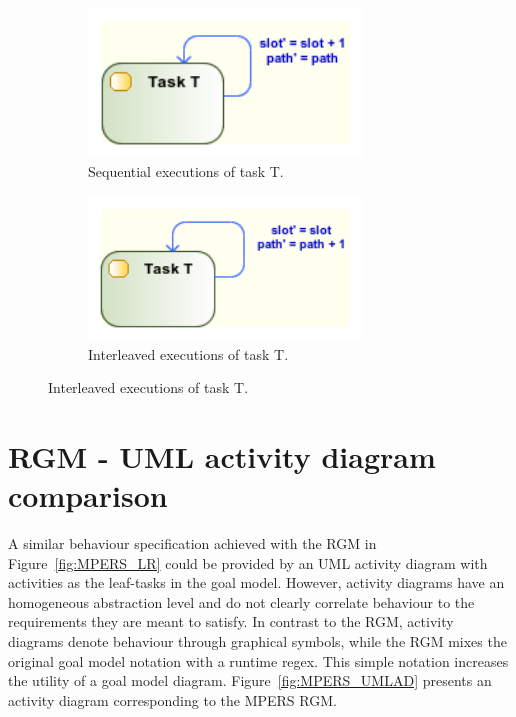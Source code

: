 \begin{figure}[ht!]
        \centering
        \begin{subfigure}[b]{0.4\textwidth}
                \includegraphics[width=0.80\textwidth]{imgs/UML_MUL_SEQ_TSKS.png}
				\caption{Sequential executions of task T.}
				\label{fig:UML_MUL_SEQ_TSKS}
        \end{subfigure}        
        \quad %
        \begin{subfigure}[b]{0.4\textwidth}                
                \includegraphics[width=0.80\textwidth]{imgs/UML_MUL_PAR_TSKS.png}
				\caption{Interleaved executions of task T.}
				\label{fig:UML_MUL_PAR_TSKS}
        \end{subfigure}%
          
\end{figure}


\section{RGM - UML activity diagram comparison}\label{ssec:RGM-UML}

A similar behaviour specification achieved with the RGM in Figure~\ref{fig:MPERS_LR} could be provided by an UML activity diagram with activities as the leaf-tasks in the goal model. However, activity diagrams have an homogeneous abstraction level and do not clearly correlate behaviour to the requirements they are meant to satisfy. In contrast to the RGM, activity diagrams denote behaviour through graphical symbols, while the RGM mixes the original goal model notation with a runtime regex. This simple notation increases the utility of a goal model diagram. Figure~\ref{fig:MPERS_UMLAD} presents an activity diagram corresponding to the MPERS RGM. 

